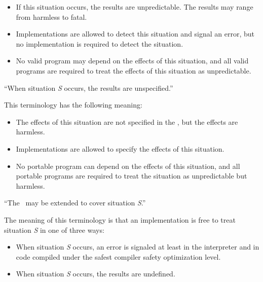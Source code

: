\begin{flushdesc}
\begin{itemize}

\item  If this situation occurs, the results are unpredictable.  The
results may range from harmless to fatal.

\item  Implementations are allowed to detect this situation and
signal an error, but no implementation is required to detect the
situation.

\item  No valid program may depend on the effects of this
situation, and all valid programs are required to treat the effects 
of this situation as unpredictable.

\end{itemize}

\item[``When situation \emph{S} occurs, the results are unspecified.'']

This terminology has the following meaning:

\nobreak
\begin{itemize}

\item  The effects of this situation are not specified in
the \OS, but the effects are harmless.

\item  Implementations are allowed to specify the effects of
this situation.

\item  No portable program can depend on the effects of this
situation, and all portable programs are required to treat the situation
as unpredictable but harmless.

\end{itemize}

\item[``The \CLOS\ may be extended to cover situation \emph{S}.'']

The meaning of this terminology is that an implementation is free to treat
situation \emph{S} in one of three ways:

\begin{itemize}

\item  When situation \emph{S} occurs, an error is signaled at least
in the interpreter and in code compiled under the safest compiler
safety optimization level.

\item  When situation \emph{S} occurs, the results are undefined.


\end{itemize}
\end{flushdesc}
